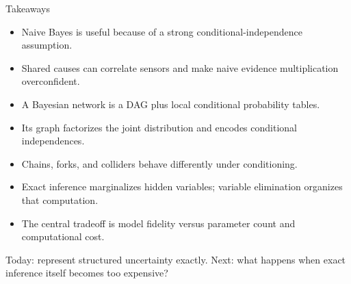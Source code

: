 \documentclass[aspectratio=169,10pt]{beamer}
\begin{document}
\begin{frame}[shrink=10]{Takeaways}
  \begin{itemize}
    \item Naive Bayes is useful because of a strong conditional-independence assumption.
    \item Shared causes can correlate sensors and make naive evidence multiplication overconfident.
    \item A Bayesian network is a DAG plus local conditional probability tables.
    \item Its graph factorizes the joint distribution and encodes conditional independences.
    \item Chains, forks, and colliders behave differently under conditioning.
    \item Exact inference marginalizes hidden variables; variable elimination organizes that computation.
    \item The central tradeoff is model fidelity versus parameter count and computational cost.
  \end{itemize}

  \begin{keyidea}
    Today: represent structured uncertainty exactly. Next: what happens when exact inference itself becomes too expensive?
  \end{keyidea}
\end{frame}
\end{document}
